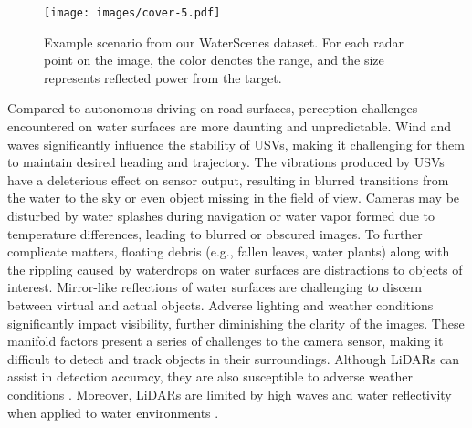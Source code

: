 \documentclass[lettersize,journal]{IEEEtran}
\begin{document}
\begin{figure}[!t]
\begin{center}
\texttt{[image: images/cover-5.pdf]}
\end{center}
\vspace{-4mm}
\caption{Example scenario from our WaterScenes dataset. For each radar point on the image, the color denotes the range, and the size represents reflected power from the target.}
\label{fig:cover}
\vspace{-4mm}
\end{figure}


Compared to autonomous driving on road surfaces, perception challenges encountered on water surfaces are more daunting and unpredictable. 
Wind and waves significantly influence the stability of USVs, making it challenging for them to maintain desired heading and trajectory. 
The vibrations produced by USVs have a deleterious effect on sensor output, resulting in blurred transitions from the water to the sky or even object missing in the field of view.
Cameras may be disturbed by water splashes during navigation or water vapor formed due to temperature differences, leading to blurred or obscured images. 
To further complicate matters, floating debris (e.g., fallen leaves, water plants) along with the rippling caused by waterdrops on water surfaces are distractions to objects of interest.
Mirror-like reflections of water surfaces are challenging to discern between virtual and actual objects.
Adverse lighting and weather conditions significantly impact visibility, further diminishing the clarity of the images. 
These manifold factors present a series of challenges to the camera sensor, making it difficult to detect and track objects in their surroundings.
Although LiDARs can assist in detection accuracy, they are also susceptible to adverse weather conditions \cite{xie2022ammf, li2022modality}. 
Moreover, LiDARs are limited by high waves and water reflectivity when applied to water environments \cite{liu2016unmanned, cheng2021we}.
\end{document}
